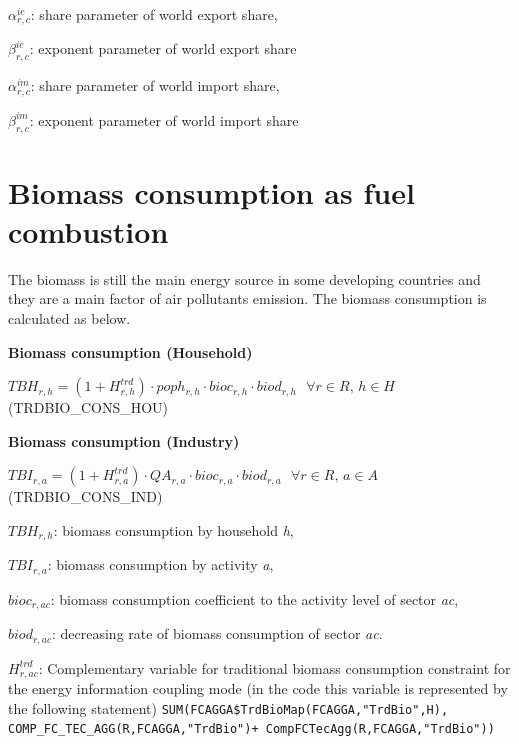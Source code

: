 \documentclass[10pt,a4paper,titlepage,dvipdfmx]{book}
\begin{document}
\begin{flushleft}
$\alpha _{r,c}^{ie}$: share parameter of world export share,

$\beta _{r,c}^{ie}$: exponent parameter of world export share

$\alpha _{r,c}^{im}$: share parameter of world import share,

$\beta _{r,c}^{im}$: exponent parameter of world import share
\end{flushleft}

\section{\label{sec:BioConFueCom}Biomass consumption as fuel combustion}

      The biomass is still the main energy source in some developing countries and they are a main factor of air pollutants emission. The biomass consumption is calculated as below.

\begin{flushleft}\textbf{Biomass consumption (Household)}\end{flushleft}


\begin{center}$TBH_{r,h}=\left(1+H _{r,h}^{trd}\right)\cdot poph_{r,h}\cdot bioc_{r,h}\cdot biod_{r,h}\,\,\,\,\forall r\in R,\,h\in H$ (TRDBIO\_CONS\_HOU)
\end{center}

\begin{flushleft}\textbf{Biomass consumption (Industry)}\end{flushleft}


\begin{center}$TBI_{r,a}=\left(1+H _{r,a}^{trd}\right)\cdot QA_{r,a}\cdot bioc_{r,a}\cdot biod_{r,a}\,\,\,\,\forall r\in R,\,a\in A$ (TRDBIO\_CONS\_IND)\label{ref-0041}
\end{center}

\begin{flushleft}
$TBH_{r,h}$: biomass consumption by household \textit{h},

$TBI_{r,a}$: biomass consumption by activity \textit{a},

$bioc_{r,ac}$: biomass consumption coefficient to the activity level of sector \textit{ac},

$biod_{r,ac}$: decreasing rate of biomass consumption of sector \textit{ac}.

$H _{r,ac}^{trd}$: Complementary variable for traditional biomass consumption constraint for the energy information coupling mode (in the code this variable is represented by the following statement)
\texttt{\textcolor{color-7}{SUM}}\texttt{(FCAGGA\$TrdBioMap(FCAGGA,}\texttt{\textcolor{color-8}{"TrdBio"}}\texttt{,H),
COMP\_FC\_TEC\_AGG(R,FCAGGA,}\texttt{\textcolor{color-8}{"TrdBio"}}\texttt{)+
CompFCTecAgg(R,FCAGGA,}\texttt{\textcolor{color-8}{"TrdBio"}}\texttt{))}
\end{flushleft}
\end{document}
